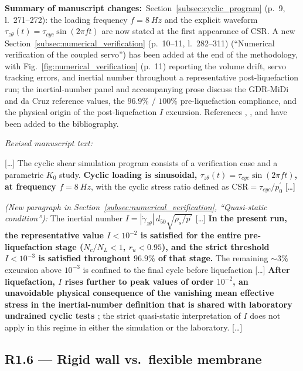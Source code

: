 \documentclass[11pt,a4paper]{article}
\newcommand{\changed}[1]{\par\noindent\textbf{Summary of manuscript changes:}\ #1\par}
\newenvironment{revtext}
  {\par\vspace{0.2em}\noindent\textit{Revised manuscript text:}\par
   \begingroup\color{black}\begin{leftbar}\small}
  {\end{leftbar}\endgroup\vspace{0.3em}}
\newcommand{\manref}[1]{(#1)}                  %
\newcommand{\Kzero}{\ensuremath{K_0}}
\newcommand{\pmean}{\ensuremath{p^{\prime}}}
\newcommand{\ru}{\ensuremath{r_u}}
\begin{document}
\changed{Section~\ref{subsec:cyclic_program} \manref{p.~9, l.~271--272}: the
loading frequency $f=\SI{8}{Hz}$ and the explicit waveform
$\tau_{z\theta}(t)=\tau_{cyc}\sin(2\pi f t)$ are now stated at the
first appearance of CSR. A new
Section~\ref{subsec:numerical_verification} \manref{p.~10--11, l.~282--311}
(``Numerical verification of the coupled servo'') has been added at
the end of the methodology, with
Fig.~\ref{fig:numerical_verification} \manref{p.~11} reporting the
volume drift, servo tracking errors, and inertial number throughout
a representative post-liquefaction run; the inertial-number panel and
accompanying prose discuss the GDR-MiDi and da Cruz reference values,
the $96.9\%$ / $100\%$ pre-liquefaction compliance, and the physical
origin of the post-liquefaction $I$ excursion. References
\citet{GDRMiDi2004}, \citet{daCruzEmam2005}, and
\citet{Wang2025inertial} have been added to the bibliography.}

\begin{revtext}
[\ldots] The cyclic shear simulation program consists of a verification
case and a parametric \Kzero{} study. \textbf{Cyclic loading is
sinusoidal, $\tau_{z\theta}(t) = \tau_{cyc}\sin(2\pi f t)$, at
frequency $f = \SI{8}{Hz}$}, with the cyclic stress ratio defined as
$\mathrm{CSR} = \tau_{cyc}/p_0^{\prime}$ [\ldots]
\medskip

\textit{(New paragraph in Section~\ref{subsec:numerical_verification},
``Quasi-static condition''):} The inertial number
$I=|\dot\gamma_{z\theta}|\,d_{50}\sqrt{\rho_s/\pmean}$ [\ldots]
\textbf{In the present run, the representative value $I < 10^{-2}$
is satisfied for the entire pre-liquefaction stage ($N_c/N_L < 1$,
$\ru < 0.95$), and the strict threshold $I < 10^{-3}$ is satisfied
throughout $96.9\%$ of that stage.} The remaining $\sim 3\%$
excursion above $10^{-3}$ is confined to the final cycle before
liquefaction [\ldots] \textbf{After liquefaction, $I$ rises further
to peak values of order $10^{-2}$, an unavoidable physical
consequence of the vanishing mean effective stress in the
inertial-number definition that is shared with laboratory undrained
cyclic tests \citep{Wang2025inertial}}; the strict quasi-static
interpretation of $I$ does not apply in this regime in either the
simulation or the laboratory. [\ldots]
\end{revtext}

\FloatBarrier

\subsection*{R1.6 --- Rigid wall vs.\ flexible membrane}
\end{document}
